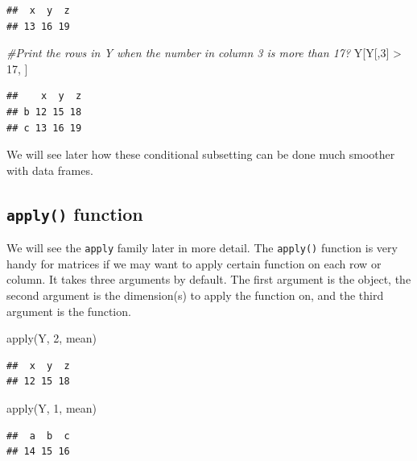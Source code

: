 \documentclass[
]{book}
\newenvironment{Shaded}{\begin{snugshade}}{\end{snugshade}}
\newcommand{\CommentTok}[1]{\textcolor[rgb]{0.56,0.35,0.01}{\textit{#1}}}
\newcommand{\DecValTok}[1]{\textcolor[rgb]{0.00,0.00,0.81}{#1}}
\newcommand{\FunctionTok}[1]{\textcolor[rgb]{0.00,0.00,0.00}{#1}}
\newcommand{\NormalTok}[1]{#1}
\newcommand{\SpecialCharTok}[1]{\textcolor[rgb]{0.00,0.00,0.00}{#1}}
\begin{document}
\begin{verbatim}
##  x  y  z 
## 13 16 19
\end{verbatim}

\begin{Shaded}
\begin{Highlighting}[]
\CommentTok{\#Print the rows in Y when the number in column 3 is more than 17?}
\NormalTok{Y[Y[,}\DecValTok{3}\NormalTok{] }\SpecialCharTok{\textgreater{}} \DecValTok{17}\NormalTok{, ]}
\end{Highlighting}
\end{Shaded}

\begin{verbatim}
##    x  y  z
## b 12 15 18
## c 13 16 19
\end{verbatim}

We will see later how these conditional subsetting can be done much smoother with data frames.

\hypertarget{apply-function}{%
\subsection{\texorpdfstring{\texttt{apply()} function}{apply() function}}\label{apply-function}}

We will see the \texttt{apply} family later in more detail. The \texttt{apply()} function is very handy for matrices if we may want to apply certain function on each row or column. It takes three arguments by default. The first argument is the object, the second argument is the dimension(s) to apply the function on, and the third argument is the function.

\begin{Shaded}
\begin{Highlighting}[]
\FunctionTok{apply}\NormalTok{(Y, }\DecValTok{2}\NormalTok{, mean)}
\end{Highlighting}
\end{Shaded}

\begin{verbatim}
##  x  y  z 
## 12 15 18
\end{verbatim}

\begin{Shaded}
\begin{Highlighting}[]
\FunctionTok{apply}\NormalTok{(Y, }\DecValTok{1}\NormalTok{, mean)}
\end{Highlighting}
\end{Shaded}

\begin{verbatim}
##  a  b  c 
## 14 15 16
\end{verbatim}
\end{document}
